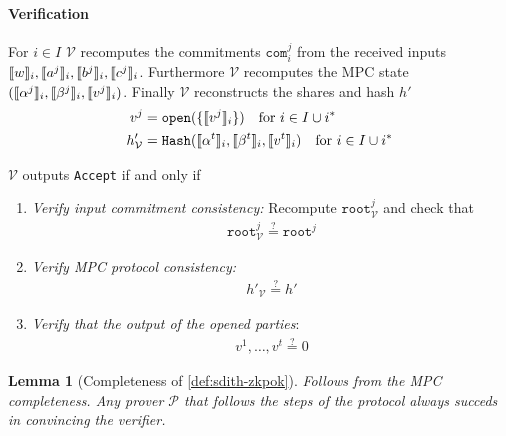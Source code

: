 \documentclass[11pt]{report}
\theoremstyle{definition}
\theoremstyle{plain}
\newtheorem{lemma}{Lemma}[section]
\begin{document}
\begin{protocol}
  \paragraph{Verification}
  For $i \in I$ $\mathcal{V}$ recomputes the commitments $\texttt{com}^j_i$ from the received inputs \\$\llbracket w \rrbracket_i, \llbracket a^j \rrbracket_i, \llbracket b^j \rrbracket_i, \llbracket c^j \rrbracket_i$. Furthermore $\mathcal{V}$ recomputes the MPC state $ (\llbracket \alpha^j \rrbracket_i, \llbracket \beta^j \rrbracket_i, \llbracket v^j \rrbracket_i)$. Finally $\mathcal{V}$ reconstructs the shares and hash $h'$
    \begin{align*}
      v^j              & = \texttt{open}(\{\llbracket v^j \rrbracket_i\}) \quad \text{for } i \in I \cup i^*                              \\
      h'_{\mathcal{V}} & = \texttt{Hash}(\llbracket \alpha^t \rrbracket_i, \llbracket \beta^t \rrbracket_i, \llbracket v^t \rrbracket_i) \quad \text{for } i \in I \cup i^*
    \end{align*}

  $\mathcal{V}$ outputs \texttt{Accept} if and only if

  \begin{enumerate}[parsep=0pt, itemsep=0pt, topsep=0pt]
    \item \textit{Verify input commitment consistency:} Recompute $\texttt{root}^j_{\mathcal{V}}$ and check that
          \begin{align*}
            \texttt{root}^j_{\mathcal{V}} \stackrel{?}{=} \texttt{root}^j
          \end{align*}
    \item \textit{Verify MPC protocol consistency:}
          \begin{align*}
            h'_{\mathcal{V}} \stackrel{?}{=} h'
          \end{align*}
    \item \textit{Verify that the output of the opened parties}:
          \begin{align*}
            v^1, \dots, v^t \stackrel{?}{=} 0
          \end{align*}
  \end{enumerate}
\end{protocol}

\begin{lemma}[Completeness of \autoref{def:sdith-zkpok}]
  Follows from the MPC completeness. Any prover $\mathcal{P}$ that follows the steps of the protocol always succeds in convincing the verifier.
\end{lemma}
\end{document}
